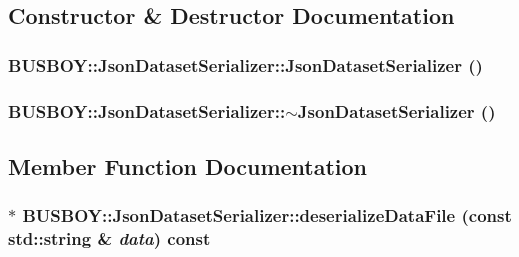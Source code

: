 \subsection{Constructor \& Destructor Documentation}
\hypertarget{classBUSBOY_1_1JsonDatasetSerializer_a93e1db108ed8b28803332111bbaaa71b}{
\subsubsection[{JsonDatasetSerializer}]{\setlength{\rightskip}{0pt plus 5cm}BUSBOY::JsonDatasetSerializer::JsonDatasetSerializer ()}}
\label{classBUSBOY_1_1JsonDatasetSerializer_a93e1db108ed8b28803332111bbaaa71b}
\hypertarget{classBUSBOY_1_1JsonDatasetSerializer_ad61d353b7faeba18e9b99da5552212c5}{
\subsubsection[{$\sim$JsonDatasetSerializer}]{\setlength{\rightskip}{0pt plus 5cm}BUSBOY::JsonDatasetSerializer::$\sim$JsonDatasetSerializer ()}}
\label{classBUSBOY_1_1JsonDatasetSerializer_ad61d353b7faeba18e9b99da5552212c5}


\subsection{Member Function Documentation}
\hypertarget{classBUSBOY_1_1JsonDatasetSerializer_af9ef2ac427bb99fd0f1d0f99774f3765}{
\subsubsection[{deserializeDataFile}]{ $\ast$ BUSBOY::JsonDatasetSerializer::deserializeDataFile (const std::string \& {\em data}) const}}
\label{classBUSBOY_1_1JsonDatasetSerializer_af9ef2ac427bb99fd0f1d0f99774f3765}


